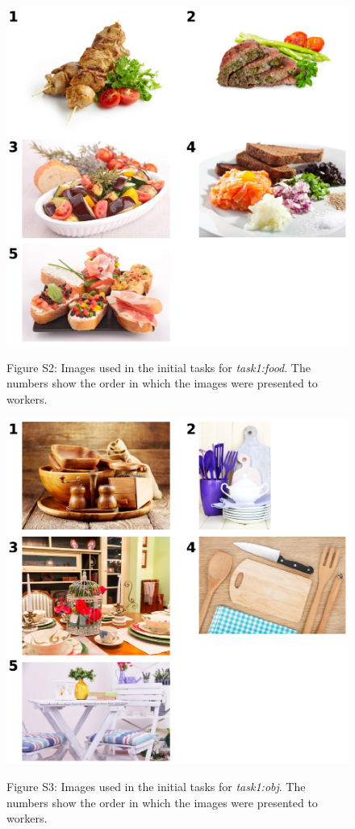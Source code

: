 \documentclass[12pt]{article}
\begin{document}
\begin{figure}
	\includegraphics{figs/task1-food.pdf}
	\label{fig:task1:food}
	\caption{
		Figure S2: Images used in the initial tasks for 
		\textit{task1:food}.  The numbers show the order in which the 
		images were presented to workers.
	}
\end{figure}

\begin{figure}
	\includegraphics{figs/task1-obj.pdf}
	\label{fig:task1:obj}
	\caption{
		Figure S3: Images used in the initial tasks for 
		\textit{task1:obj}.  The numbers show the order in which the 
		images were presented to workers.
	}
\end{figure}
\end{document}
